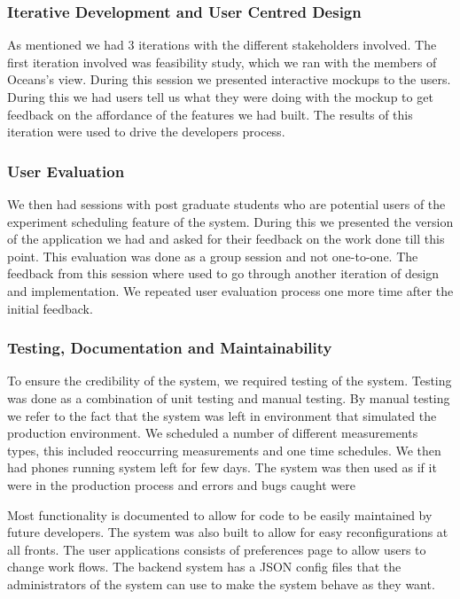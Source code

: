 \subsubsection{Iterative Development and User Centred Design}
As mentioned we had 3 iterations with the different stakeholders involved.
The first iteration involved was feasibility study, which we ran with the members of Oceans's view.
During this session we presented interactive mockups to the users.
During this we had users tell us what they were doing with the mockup to get feedback on the affordance of the features we had built.
The results of this iteration were used to drive the developers process.
\subsubsection{User Evaluation}
We then had sessions with post graduate students who are potential users of the experiment scheduling feature of the system.
During this we presented the version of the application we had and asked for their feedback on the work done till this point.
This evaluation was done as a group session and not one-to-one.
The feedback from this session where used to go through another iteration of design and implementation.
We repeated user evaluation process one more time after the initial feedback.
\subsubsection{Testing, Documentation and Maintainability}
To ensure the credibility of the system, we required testing of the system.
Testing was done as a combination of unit testing and manual testing.
By manual testing we refer to the fact that the system was left in environment that simulated the production environment.
We scheduled a number of different measurements types, this included reoccurring measurements and one time schedules.
We then had phones running system left for few days.
The system was then used as if it were in the production process and errors and bugs caught were

Most functionality is documented to allow for code to be easily maintained by future developers.
The system was also built to allow for easy reconfigurations at all fronts.
The user applications consists of preferences page to allow users to change work flows.
The backend system has a JSON config files that the administrators of the system can use to make the system behave as they want.
